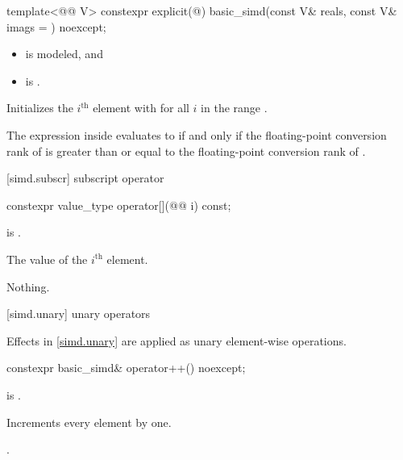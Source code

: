 \begin{itemdecl}
template<@@ V>
  constexpr explicit(@\seebelow@)
    basic_simd(const V& reals, const V& imags = {}) noexcept;
\end{itemdecl}

\begin{itemdescr}
\pnum
\constraints
\begin{itemize}
 \item
    is modeled, and
 \item
    is .
\end{itemize}

\pnum
\effects
Initializes the $i^\text{th}$ element with  for all $i$ in the range .

\pnum
\remarks
The expression inside  evaluates to  if and only
if the floating-point conversion rank of  is greater than
or equal to the floating-point conversion rank of .
\end{itemdescr}

[simd.subscr]{ subscript operator}

\begin{itemdecl}
constexpr value_type operator[](@@ i) const;
\end{itemdecl}

\begin{itemdescr}
\pnum
\expects
{} is .

\pnum
\returns
The value of the $i^\text{th}$ element.

\pnum
\throws
Nothing.
\end{itemdescr}

[simd.unary]{ unary operators}

\pnum
Effects in \ref{simd.unary} are applied as unary element-wise operations.

\begin{itemdecl}
constexpr basic_simd& operator++() noexcept;
\end{itemdecl}

\begin{itemdescr}
\pnum
\constraints
{} is .

\pnum
\effects
Increments every element by one.

\pnum
\returns
{}.
\end{itemdescr}

